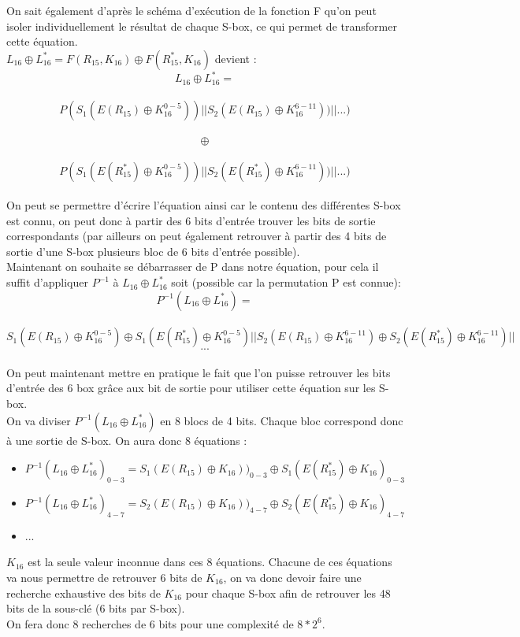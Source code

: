 \documentclass[a4paper,11pt]{article}
\begin{document}
	On sait également d'après le schéma d'exécution de la fonction F qu'on peut isoler individuellement le résultat de chaque S-box, ce qui permet de  transformer cette équation.\\
	$L_{16}  \oplus L_{16}^{*} = F(R_{15}, K_{16}) \oplus F(R_{15}^{*}, K_{16})$  devient :\\
	$$L_{16} \oplus L_{16}^{*} = $$\\
	$$P(S_{1}(E(R_{15}) \oplus K_{16}^{0-5})) || S_{2}(E(R_{15}) \oplus K_{16}^{6-11}))||...)$$\\
	$$\oplus$$\\
	$$P(S_{1}(E(R_{15}^{*}) \oplus K_{16}^{0-5}))||S_{2}(E(R_{15}^{*}) \oplus K_{16}^{6-11}))||...)$$\\
	On peut se permettre d'écrire l'équation ainsi car le contenu des différentes S-box est connu, on peut donc à partir des 6 bits d'entrée trouver les bits de sortie correspondants (par ailleurs on peut également retrouver à partir des 4 bits de sortie d'une S-box plusieurs bloc de 6 bits d'entrée possible).\\
	
	Maintenant on souhaite se débarrasser de P dans notre équation, pour cela il suffit d'appliquer $P^{-1}$ à 	$L_{16}  \oplus L_{16}^{*}$ soit (possible car la permutation P est connue): \\
	$$P^{-1} (L_{16}  \oplus L_{16}^{*}) = $$\\
	$$S_{1}(E(R_{15}) \oplus K_{16}^{0-5}) \oplus S_{1}(E(R_{15}^{*}) \oplus K_{16}^{0-5})
	 || 
	S_{2}(E(R_{15})\oplus K_{16}^{6-11}) \oplus S_{2}(E(R_{15}^{*}) \oplus K_{16}^{6-11})||$$
	$$...$$\\
	
	On peut maintenant mettre en pratique le fait que l'on puisse retrouver les bits d'entrée des 6 box grâce aux bit de sortie pour utiliser cette équation sur les S-box.\\
	On va diviser $P^{-1} (L_{16}  \oplus L_{16}^{*})$ en 8 blocs de 4 bits. Chaque bloc correspond donc à une sortie de S-box. 
	On aura donc 8 équations :\\
	\begin{itemize}
		\item $P^{-1} (L_{16}  \oplus L_{16}^{*})_{0-3} = S_{1}(E(R_{15}) \oplus K_{16}))_{0-3} \oplus S_{1}(E(R_{15}^{*}) \oplus K_{16})_{0-3} $
		\item $P^{-1} (L_{16}  \oplus L_{16}^{*})_{4-7} = S_{2}(E(R_{15}) \oplus K_{16}))_{4-7} \oplus S_{2}(E(R_{15}^{*}) \oplus K_{16})_{4-7} $
		\item ...
	\end{itemize}
	$K_{16}$ est la seule valeur inconnue dans ces 8 équations. Chacune de ces équations va nous permettre de retrouver 6 bits de $K_{16}$, on va donc devoir faire une recherche exhaustive des bits de $K_{16}$ pour chaque S-box afin de retrouver les 48 bits de la sous-clé (6 bits par S-box).\\
	On fera donc 8 recherches de 6 bits pour une complexité de $8 * 2^{6} $.
	
\end{document}
